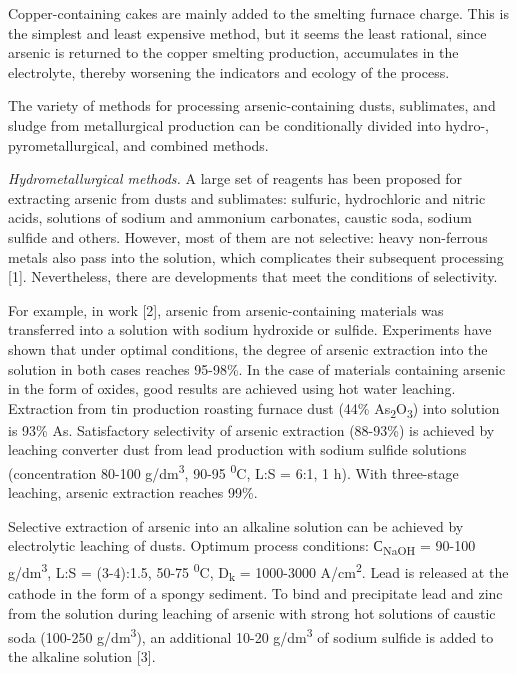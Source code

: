 \begin{multicols}{2}
Copper-containing cakes are mainly added to the smelting furnace charge.
This is the simplest and least expensive method, but it seems the least
rational, since arsenic is returned to the copper smelting production,
accumulates in the electrolyte, thereby worsening the indicators and
ecology of the process.

The variety of methods for processing arsenic-containing dusts,
sublimates, and sludge from metallurgical production can be
conditionally divided into hydro-, pyrometallurgical, and combined
methods.

\emph{Hydrometallurgical methods.} A large set of reagents has been
proposed for extracting arsenic from dusts and sublimates: sulfuric,
hydrochloric and nitric acids, solutions of sodium and ammonium
carbonates, caustic soda, sodium sulfide and others. However, most of
them are not selective: heavy non-ferrous metals also pass into the
solution, which complicates their subsequent processing {[}1{]}.
Nevertheless, there are developments that meet the conditions of
selectivity.

For example, in work {[}2{]}, arsenic from arsenic-containing materials
was transferred into a solution with sodium hydroxide or sulfide.
Experiments have shown that under optimal conditions, the degree of
arsenic extraction into the solution in both cases reaches 95-98\%. In
the case of materials containing arsenic in the form of oxides, good
results are achieved using hot water leaching. Extraction from tin
production roasting furnace dust (44\%
As\textsubscript{2}O\textsubscript{3}) into solution is 93\% As.
Satisfactory selectivity of arsenic extraction (88-93\%) is achieved by
leaching converter dust from lead production with sodium sulfide
solutions (concentration 80-100 g/dm\textsuperscript{3}, 90-95
\textsuperscript{0}C, L:S = 6:1, 1 h). With three-stage leaching,
arsenic extraction reaches 99\%.

Selective extraction of arsenic into an alkaline solution can be
achieved by electrolytic leaching of dusts. Optimum process conditions:
С\textsubscript{NaOH} = 90-100 g/dm\textsuperscript{3}, L:S = (3-4):1.5,
50-75 \textsuperscript{0}C, D\textsubscript{k} = 1000-3000
A/cm\textsuperscript{2}. Lead is released at the cathode in the form of
a spongy sediment. To bind and precipitate lead and zinc from the
solution during leaching of arsenic with strong hot solutions of caustic
soda (100-250 g/dm\textsuperscript{3}), an additional 10-20
g/dm\textsuperscript{3} of sodium sulfide is added to the alkaline
solution {[}3{]}.


\end{multicols}
